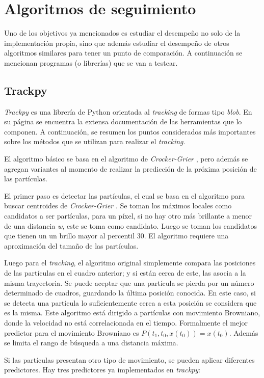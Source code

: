\section{Algoritmos de seguimiento}
Uno de los objetivos ya mencionados es estudiar el desempeño no solo de la implementación propia, sino que además estudiar el desempeño de otros algoritmos similares para tener un punto de comparación. A continuación se mencionan programas (o librerías) que se van a testear. 
\subsection{Trackpy}

\textit{Trackpy} \cite{trackpy} es una librería de Python orientada al \textit{tracking} de formas tipo \textit{blob}. En su página se encuentra la extensa documentación de las herramientas que lo componen. A continuación, se resumen los puntos considerados más importantes sobre los métodos que se utilizan para realizar el \textit{tracking}.

El algoritmo básico se basa en el algoritmo de \textit{Crocker-Grier} \cite{CrockerGrier}, pero además se agregan variantes al momento de realizar la predicción de la próxima posición de las partículas.

El primer paso es detectar las partículas, el cual se basa en el algoritmo para buscar centroides de \textit{Crocker-Grier} \cite{CrockerGrier}. Se toman los máximos locales como candidatos a ser partículas, para un píxel, si no hay otro más brillante a menor de una distancia \textit{w}, este se toma como candidato. Luego se toman los candidatos que tienen un un brillo mayor al percentil 30. El algoritmo requiere una aproximación del tamaño de las partículas.

Luego para el \textit{tracking}, el algoritmo original simplemente compara las posiciones de las partículas en el cuadro anterior; y si están cerca de este, las asocia a la misma trayectoria. Se puede aceptar que una partícula se pierda por un número determinado de cuadros, guardando la última posición conocida. En este caso, si se detecta una partícula lo suficientemente cerca a esta posición se considera que es la misma. Este algoritmo está dirigido a partículas con movimiento Browniano, donde la velocidad no está correlacionada en el tiempo. Formalmente el mejor predictor para el movimiento Browniano es $P(t_1, t_0, x(t_0)) = x(t_0)$. Además se limita el rango de búsqueda a una distancia máxima.

Si las partículas presentan otro tipo de movimiento, se pueden aplicar diferentes predictores. Hay tres predictores ya implementados en \textit{trackpy}:

